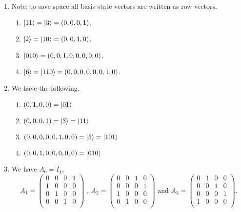 \documentclass [12pt]{article}
\theoremstyle{definition}
\begin{document}
\begin{enumerate}
\renewcommand{\labelenumii}{\alph{enumii}.}

\item Note: to save space all basis state vectors are written as row vectors.

\begin{enumerate}
\item $\ket{11} = \ket{3} = (0,0,0,1)$.
\item $\ket{2} = \ket{10} = (0,0,1,0)$.
\item $\ket{010} = (0, 0, 1, 0, 0, 0, 0, 0)$.
\item $\ket{6}=\ket{110} = (0,0,0,0,0,0,1,0)$.
\end{enumerate}

\item We have the following.

\begin{enumerate}
\item $(0,1,0,0)=\ket{01}$
\item $(0,0,0,1) = \ket{3} = \ket{11}$
\item $(0,0,0,0,0,1,0,0)=\ket{5}=\ket{101}$
\item $(0,0,1,0,0,0,0,0)=\ket{010}$
\end{enumerate}




\item We have $A_0=I_4$,
\[
A_1=\left(\begin{array}{cccc}
0 & 0 & 0 & 1 \\
1 & 0 & 0 & 0 \\
0 & 1 & 0 & 0 \\
0 & 0 & 1 & 0 \\
\end{array}\right)
\mbox{ , }
A_2=\left(\begin{array}{cccc}
0 & 0 & 1 & 0 \\
0 & 0 & 0 & 1 \\
1 & 0 & 0 & 0 \\
0 & 1 & 0 & 0 \\
\end{array}\right)
\mbox{ and }
A_3=
\left(\begin{array}{cccc}
0 & 1 & 0 & 0 \\
0 & 0 & 1 & 0 \\
0 & 0 & 0 & 1 \\
1 & 0 & 0 & 0 \\
\end{array}\right).
\]






\end{enumerate}
\end{document}
